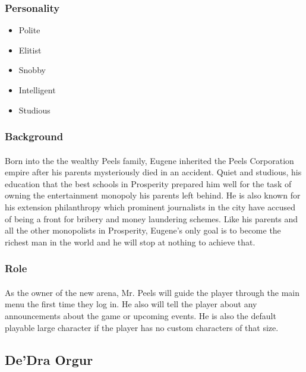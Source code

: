 \subsubsection{Personality}

\begin{itemize}
    \item Polite
    \item Elitist
    \item Snobby
    \item Intelligent
    \item Studious
\end{itemize}

\subsubsection{Background}

\paragraph{} Born into the the wealthy Peels family, Eugene inherited the Peels Corporation empire after his parents mysteriously died in an accident. Quiet and studious, his education that the best schools in Prosperity prepared him well for the task of owning the entertainment monopoly his parents left behind. He is also known for his extension philanthropy which prominent journalists in the city have accused of being a front for bribery and money laundering schemes. Like his parents and all the other monopolists in Prosperity, Eugene's only goal is to become the richest man in the world and he will stop at nothing to achieve that.

\subsubsection{Role}

\paragraph{} As the owner of the new arena, Mr. Peels will guide the player through the main menu the first time they log in. He also will tell the player about any announcements about the game or upcoming events. He is also the default playable large character if the player has no custom characters of that size.

\pagebreak

\subsection{De'Dra Orgur}

